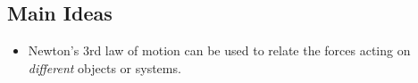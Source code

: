 \documentclass[]{article}
\begin{document}
\newpage
\begin{TeacherMargin}

\end{TeacherMargin}
\begin{PresentSpace}
\section*{Main Ideas}
\begin{itemize}
	\item Newton's 3rd law of motion can be used to relate the forces acting on \textit{different} objects or systems.
\end{itemize}
\end{PresentSpace}
\end{document}
